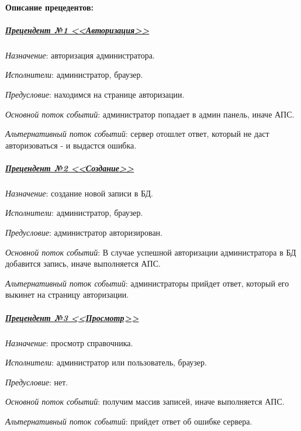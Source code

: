 \paragraph{Описание прецедентов:}


\subparagraph{\underline{Прецендент №1 <<Авторизация>>}} \hspace{0pt}

\textit{Назначение}: авторизация администратора.

\textit{Исполнители}: администратор, браузер.

\textit{Предусловие}: находимся на странице авторизации.

\textit{Основной поток событий}: администратор попадает в админ панель, иначе АПС.

\textit{Альтернативный поток событий}: сервер отошлет ответ, который не даст авторизоваться - и выдастся ошибка.


\subparagraph{\underline{Прецендент №2 <<Создание>>}} \hspace{0pt}

\textit{Назначение}: создание новой записи в БД.

\textit{Исполнители}: администратор, браузер.

\textit{Предусловие}: администратор авторизирован.

\textit{Основной поток событий}: В случае успешной авторизации администратора в БД добавится запись, иначе выполняется АПС.

\textit{Альтернативный поток событий}: администраторы прийдет ответ, который его выкинет на страницу авторизации.


\subparagraph{\underline{Прецендент №3 <<Просмотр>>}} \hspace{0pt}

\textit{Назначение}: просмотр справочника.

\textit{Исполнители}: администратор или пользователь, браузер.

\textit{Предусловие}: нет.

\textit{Основной поток событий}: получим массив записей, иначе выполняется АПС.

\textit{Альтернативный поток событий}: прийдет ответ об ошибке сервера.


